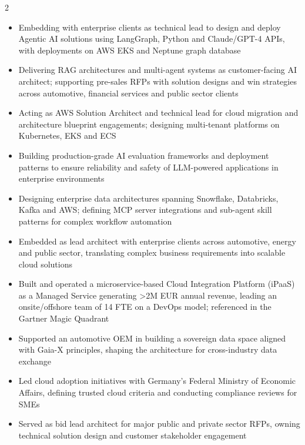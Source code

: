 \documentclass[10pt,a4paper,ragged2e,withhyper]{altacv}
\begin{document}
\begin{paracol}{2}

\begin{itemize}
\item Embedding with enterprise clients as technical lead to design and deploy Agentic AI solutions using LangGraph, Python and Claude/GPT-4 APIs, with deployments on AWS EKS and Neptune graph database
\item Delivering RAG architectures and multi-agent systems as customer-facing AI architect; supporting pre-sales RFPs with solution designs and win strategies across automotive, financial services and public sector clients
\item Acting as AWS Solution Architect and technical lead for cloud migration and architecture blueprint engagements; designing multi-tenant platforms on Kubernetes, EKS and ECS
\item Building production-grade AI evaluation frameworks and deployment patterns to ensure reliability and safety of LLM-powered applications in enterprise environments
\item Designing enterprise data architectures spanning Snowflake, Databricks, Kafka and AWS; defining MCP server integrations and sub-agent skill patterns for complex workflow automation
\end{itemize}

\divider

\begin{itemize}
\item Embedded as lead architect with enterprise clients across automotive, energy and public sector, translating complex business requirements into scalable cloud solutions 
\item Built and operated a microservice-based Cloud Integration Platform (iPaaS) as a Managed Service generating \textgreater{}2M EUR annual revenue, leading an onsite/offshore team of 14 FTE on a DevOps model; referenced in the Gartner Magic Quadrant
\item Supported an automotive OEM in building a sovereign data space aligned with Gaia-X principles, shaping the architecture for cross-industry data exchange
\item Led cloud adoption initiatives with Germany's Federal Ministry of Economic Affairs, defining trusted cloud criteria and conducting compliance reviews for SMEs
\item Served as bid lead architect for major public and private sector RFPs, owning technical solution design and customer stakeholder engagement
\end{itemize}


\end{paracol}
\end{document}
